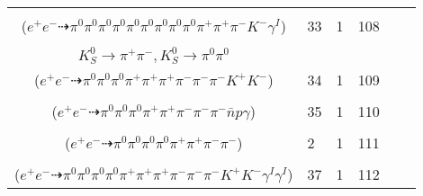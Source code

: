 \documentclass[landscape]{article}
\newcounter{rownumbers}
\newcommand\rn{\stepcounter{rownumbers}\arabic{rownumbers}}
\newcommand{\EOL}{\\} %
\newcommand{\topoTags}[1]{#1} %
\begin{document}
\begin{longtable}{clcccc}
\rn & \makecell[l]{ $ 
e^{+} e^{-} \rightarrow \pi^{0} \pi^{0} \rho^{0} \pi^{+} K^{0} K^{-} \eta^{\prime} \gamma^{I} ,
\rho^{0} \rightarrow \pi^{+} \pi^{-} ,
K^{0} \rightarrow K_{S}^{0} ,
\eta^{\prime} \rightarrow \pi^{0} \pi^{0} \eta ,
K_{S}^{0} \rightarrow \pi^{0} \pi^{0} ,
\eta \rightarrow \pi^{0} \pi^{0} \pi^{0} 
$ \\ ($
e^{+} e^{-} \dashrightarrow \pi^{0} \pi^{0} \pi^{0} \pi^{0} \pi^{0} \pi^{0} \pi^{0} \pi^{0} \pi^{0} \pi^{+} \pi^{+} \pi^{-} K^{-} \gamma^{I} 
$) } & \topoTags{33 & }1 & 108 \EOL

\rn & \makecell[l]{ $ 
e^{+} e^{-} \rightarrow \rho^{0} \rho^{-} K^{0} \bar{K}^{0} \bar{K}^{*} K^{+} ,
\rho^{0} \rightarrow \pi^{+} \pi^{-} ,
\rho^{-} \rightarrow \pi^{0} \pi^{-} ,
K^{0} \rightarrow K_{S}^{0} ,
\bar{K}^{0} \rightarrow K_{S}^{0} ,
\bar{K}^{*} \rightarrow \pi^{+} K^{-} ,
$ \\ $
K_{S}^{0} \rightarrow \pi^{+} \pi^{-} ,
K_{S}^{0} \rightarrow \pi^{0} \pi^{0} 
$ \\ ($
e^{+} e^{-} \dashrightarrow \pi^{0} \pi^{0} \pi^{0} \pi^{+} \pi^{+} \pi^{+} \pi^{-} \pi^{-} \pi^{-} K^{+} K^{-} 
$) } & \topoTags{34 & }1 & 109 \EOL

\rn & \makecell[l]{ $ 
e^{+} e^{-} \rightarrow \pi^{-} \rho^{-} \omega \omega \bar{\Delta}^{+} p ,
\rho^{-} \rightarrow \pi^{0} \pi^{-} ,
\omega \rightarrow \pi^{0} \gamma ,
\omega \rightarrow \pi^{0} \pi^{+} \pi^{-} ,
\bar{\Delta}^{+} \rightarrow \pi^{+} \bar{n} 
$ \\ ($
e^{+} e^{-} \dashrightarrow \pi^{0} \pi^{0} \pi^{0} \pi^{+} \pi^{+} \pi^{-} \pi^{-} \pi^{-} \bar{n} p \gamma 
$) } & \topoTags{35 & }1 & 110 \EOL

\rn & \makecell[l]{ $ 
e^{+} e^{-} \rightarrow \pi^{0} \pi^{0} \pi^{-} \pi^{-} \rho^{+} \rho^{+} ,
\rho^{+} \rightarrow \pi^{0} \pi^{+} ,
\rho^{+} \rightarrow \pi^{0} \pi^{+} 
$ \\ ($
e^{+} e^{-} \dashrightarrow \pi^{0} \pi^{0} \pi^{0} \pi^{0} \pi^{+} \pi^{+} \pi^{-} \pi^{-} 
$) } & \topoTags{2 & }1 & 111 \EOL

\rn & \makecell[l]{ $ 
e^{+} e^{-} \rightarrow \pi^{0} \pi^{-} \rho^{+} \rho^{+} \omega K^{*} K^{-} \gamma^{I} \gamma^{I} ,
\rho^{+} \rightarrow \pi^{0} \pi^{+} ,
\rho^{+} \rightarrow \pi^{0} \pi^{+} ,
\omega \rightarrow \pi^{0} \pi^{+} \pi^{-} ,
K^{*} \rightarrow \pi^{-} K^{+} 
$ \\ ($
e^{+} e^{-} \dashrightarrow \pi^{0} \pi^{0} \pi^{0} \pi^{0} \pi^{+} \pi^{+} \pi^{+} \pi^{-} \pi^{-} \pi^{-} K^{+} K^{-} \gamma^{I} \gamma^{I} 
$) } & \topoTags{37 & }1 & 112 \EOL


\end{longtable}
\end{document}
